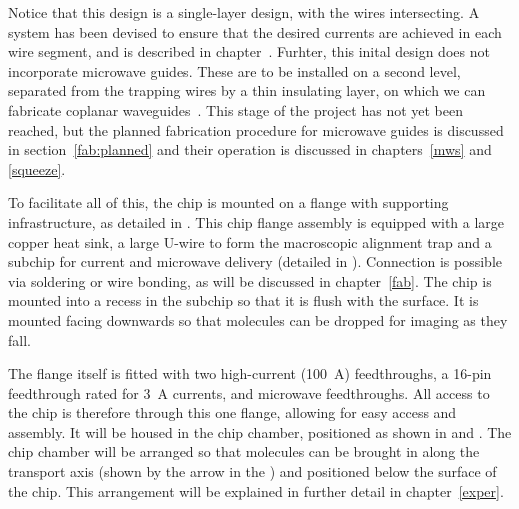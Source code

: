 Notice that this design is a single-layer design, with the wires intersecting.
A system has been devised to ensure that the desired currents are achieved in
each wire segment, and is described in chapter~. Furhter, this
inital design does not incorporate microwave guides. These are to be
installed on a second level, separated from the trapping wires by a thin
insulating layer, on which we can fabricate coplanar waveguides~\cite{1127105}.
This stage of the project has not yet been reached, but the planned fabrication
procedure for microwave guides is discussed in section~\ref{fab:planned} and
their operation is discussed in chapters~\ref{mws} and \ref{squeeze}.

To facilitate all of this, the chip is mounted on a flange with supporting
infrastructure, as detailed in . This chip
flange assembly is equipped with a large copper heat sink, a large U-wire to
form the macroscopic alignment trap and a subchip for current and microwave
delivery (detailed in ). Connection is possible
via soldering or wire bonding, as will be discussed in chapter~\ref{fab}. The
chip is mounted into a recess in the subchip so that it is flush with the
surface. It is mounted facing downwards so that molecules can be dropped for
imaging as they fall.

The flange itself is fitted with two high-current (\SI{100}{\ampere})
feedthroughs, a 16-pin feedthrough rated for \SI{3}{\ampere} currents, and
microwave feedthroughs. All access to the chip is therefore through this one
flange, allowing for easy access and assembly.  It will be housed in the chip
chamber, positioned as shown in  and
. The chip chamber will be arranged so that
molecules can be brought in along the transport axis (shown by the arrow in the
) and positioned below the surface of
the chip. This arrangement will be explained in further detail in
chapter~\ref{exper}.

